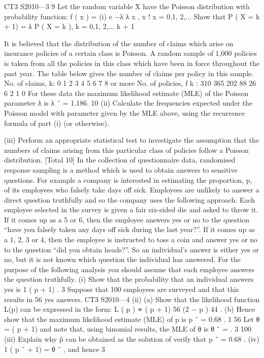 \documentclass[a4paper,12pt]{article}
\begin{document}
\begin{enumerate}
CT3 S2010—3
9
Let the random variable X have the Poisson distribution with probability function:
f ( x ) =
(i)
e −λ λ x
,
x !
x = 0,1, 2,...
Show that P ( X = k + 1) =
λ
P ( X = k ), k = 0,1, 2,...
k + 1

It is believed that the distribution of the number of claims which arise on insurance
policies of a certain class is Poisson. A random sample of 1,000 policies is taken
from all the policies in this class which have been in force throughout the past year.
The table below gives the number of claims per policy in this sample.
No. of claims, k: 0
1
2
3 4 5 6 7 8 or more
No. of policies, f k : 310 365 202 88 26 6 2 1
0
For these data the maximum likelihood estimate (MLE) of the Poisson parameter λ is
λ ˆ = 1.186.
10
(ii) Calculate the frequencies expected under the Poisson model with parameter
given by the MLE above, using the recurrence formula of part (i) (or
otherwise).

(iii) Perform an appropriate statistical test to investigate the assumption that the
numbers of claims arising from this particular class of policies follow a
Poisson distribution.
[Total 10]
In the collection of questionnaire data, randomised response sampling is a method
which is used to obtain answers to sensitive questions. For example a company is
interested in estimating the proportion, p, of its employees who falsely take days off
sick. Employees are unlikely to answer a direct question truthfully and so the
company uses the following approach.
Each employee selected in the survey is given a fair six-sided die and asked to throw
it. If it comes up as a 5 or 6, then the employee answers yes or no to the question
“have you falsely taken any days off sick during the last year?”. If it comes up as a 1,
2, 3 or 4, then the employee is instructed to toss a coin and answer yes or no to the
question “did you obtain heads?”. So an individual’s answer is either yes or no, but it
is not known which question the individual has answered.
For the purpose of the following analysis you should assume that each employee
answers the question truthfully.
(i)
Show that the probability that an individual answers yes is
1
( p + 1) .
3
Suppose that 100 employees are surveyed and that this results in 56 yes answers.
CT3 S2010—4
(ii)
(a)
Show that the likelihood function L(p) can be expressed in the form:
L ( p ) ∝ ( p + 1) 56 (2 − p ) 44 .
(b)
Hence show that the maximum likelihood estimate (MLE) of p is
p ˆ = 0.68 .
1
56
Let θ = ( p + 1) and note that, using binomial results, the MLE of θ is θ ˆ =
.
3
100
(iii)
Explain why p̂ can be obtained as the solution of
verify that p ˆ = 0.68 .
(iv)
1
( p ˆ + 1) = θ ˆ , and hence
3


\end{enumerate}
\end{document}
